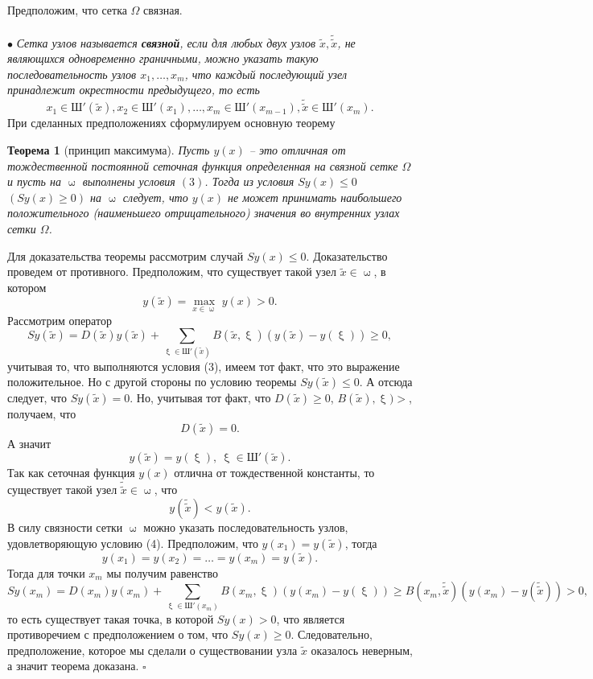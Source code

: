 \documentclass[a4paper, 12pt]{report}
\numberwithin{equation}{section}
\newenvironment{Proof} %
{\par\noindent{$\blacklozenge$}} %
{\hfill$\scriptstyle\square$}
\renewcommand{\leq}{\leqslant}
\renewcommand{\geq}{\geqslant}
\renewcommand{\omega}{\upomega}
\renewcommand{\xi}{\upxi}
\newtheorem*{theorem}{Теорема}
\begin{document}
		Предположим, что сетка $\Omega$ связная.\\\\
		$\bullet$ \textit{Сетка узлов называется \textbf{связной}, если для любых двух узлов $\tilde x, \tilde{\tilde{x}}$, не являющихся одновременно граничными, можно указать такую последовательность узлов $x_1,\ldots, x_m$, что каждый последующий узел принадлежит окрестности предыдущего, то есть} 
		\begin{equation}
			x_1 \in \text{Ш}'(\tilde x), x_2 \in \text{Ш}'(x_1),\ldots, x_m \in \text{Ш}'(x_{m-1}), \tilde{\tilde x} \in \text{Ш}'(x_m).
		\end{equation}
		При сделанных предположениях сформулируем основную теорему
		\begin{theorem}
			[принцип максимума]
			Пусть $y(x)$ -- это отличная от тождественной постоянной сеточная функция определенная на связной сетке $\Omega$ и пусть на $\omega$ выполнены условия $(3)$. Тогда из условия $S y(x) \leq 0$ $(Sy(x) \geq 0)$ на $\omega$ следует, что $y(x)$ не может принимать наибольшего положительного (наименьшего отрицательного) значения во внутренних узлах сетки $\Omega$.
		\end{theorem}
		\begin{Proof}
			Для доказательства теоремы рассмотрим случай $Sy(x) \leq 0$. Доказательство проведем от противного. Предположим, что существует такой узел $\tilde x \in \omega$, в котором $$y(\tilde x) = \underset{x \in \omega}{\max}\ y(x) > 0.$$
			Рассмотрим оператор $$Sy(\tilde x) = D(\tilde x) y(\tilde x) + \sum_{\xi \in \text{Ш}'(\tilde x)} B(\tilde x, \xi) (y(\tilde x) - y(\xi))\geq 0,$$
			 учитывая то, что выполняются условия (3), имеем тот факт, что это выражение положительное. Но с другой стороны по условию теоремы $Sy(\tilde x) \leq 0$. А отсюда следует, что $S y(\tilde x) = 0$. Но, учитывая тот факт, что $D(\tilde x)\geq 0$, $B (\tilde x), \xi) > $, получаем, что $$D(\tilde x) = 0.$$ А значит $$y(\tilde x) = y(\xi),\ \xi \in \text{Ш}'(\tilde x).$$
			 Так как сеточная функция $y(x)$ отлична от тождественной константы, то существует такой узел $\tilde{\tilde x}\in \omega$, что $$y(\tilde{\tilde x})<y(\tilde x).$$
			 В силу связности сетки $\omega$ можно указать последовательность узлов, удовлетворяющую условию (4). Предположим, что $y(x_1) = y(\tilde x)$, тогда 
			 $$y(x_1) = y(x_2) = \ldots = y(x_m) = y(\tilde x).$$
			 Тогда для точки $x_m$ мы получим равенство
			 $$Sy(x_m) = D(x_m) y(x_m) + \sum_{\xi \in \text{Ш}'(x_m)} B(x_m, \xi) (y(x_m) - y(\xi))\geq B(x_m, \tilde{\tilde x}) (y(x_m) - y(\tilde{\tilde x}))> 0,$$
			 то есть существует такая точка, в которой $Sy(x)>0$, что является противоречием с предположением о том, что $Sy(x) \geq 0$. Следовательно, предположение, которое мы сделали о существовании узла $\tilde x$ оказалось неверным, а значит теорема доказана.
		\end{Proof}\\\\
\end{document}
